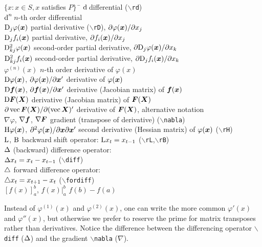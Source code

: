 \documentclass[11pt,dvips,a4paper]{article}
\newcommand{\hspacesymbols}%
   {$\{x: x \in S, x$ satisfies $P\}\;\;$} %
\newcommand{\type}[1]{{\tt$\backslash$#1}}
\begin{document}
\begin{tabbing}
\hspacesymbols \=   \kill
$\rd$ \> differential (\type{rd})  \\
$\rd^n$ \> $n$-th order differential   \\
$\mathrm{D}_{j}\varphi(\bm x)$ \> partial derivative (\type{rD}),
$\partial\varphi(\bm x)/\partial x_j$ \\
$\mathrm{D}_{j}f_i(\bm x)$ \> partial derivative,
$\partial f_i(\bm x)/\partial x_j$ \\
$\mathrm{D}_{kj}^2\varphi(\bm x)$ \> second-order partial derivative,
$\partial\mathrm{D}_{j}\varphi(\bm x)/\partial x_k$ \\
$\mathrm{D}_{kj}^2 f_i(\bm x)$ \> second-order partial derivative,
$\partial\mathrm{D}_j f_i(\bm x)/\partial x_k$ \\
$\varphi^{(n)}(x)$ \> $n$-th order derivative of $\varphi(x)$ \\
$\mathrm{D}\varphi(\bm x)$, $\partial\varphi(\bm x)/\partial \bm x'$ \> derivative of $\varphi(\bm x)$ \\
$\mathrm{D} \bm f(\bm x)$, $\partial \bm f(\bm x)/\partial \bm x'$ \> derivative (Jacobian matrix) of $\bm f(\bm x)$ \\
$\mathrm{D} \bm F(\bm X)$ \> derivative (Jacobian matrix) of $\bm F(\bm X)$  \\
$\partial\operatorname{vec} \bm F(\bm X)/\partial(\operatorname{vec} \bm X)'$ \> derivative of $\bm F(\bm X)$, alternative notation\\
$\nabla\varphi$, $\nabla \bm f$, $\nabla \bm F$ \> gradient (transpose of derivative) (\type{nabla})\\
$\mathrm{H}\varphi(\bm x)$, $\partial^2\varphi(\bm x)/\partial \bm x\partial \bm x'$ \>
second derivative (Hessian matrix) of $\varphi(\bm x)$ (\type{rH})\\
$\mathrm{L}$, $\mathrm{B}$ \> backward shift operator: $\mathrm{L} x_t=x_{t-1}$  (\type{rL},\type{rB})\\
$\Delta$ \> (backward) difference operator: \\
\>$\Delta x_t=x_t-x_{t-1}$  (\type{diff})\\
$\bigtriangleup$ \> forward difference operator: \\
\> $\bigtriangleup x_t=x_{t+1}-x_t$ (\type{fordiff})\\
$[f(x)]_a^b$,\; $f(x)|_a^b$ \> $f(b)-f(a)$
\end{tabbing}
Instead of $\varphi^{(1)}(x)$ and $\varphi^{(2)}(x)$, one can
write the more common
$\varphi'(x)$ and $\varphi''(x)$, but otherwise we prefer to reserve
the prime for matrix transposes rather than derivatives. Notice the
difference between the differencing operator \type{diff} ($\Delta$)
and the gradient \type{nabla} ($\nabla$).
\end{document}

